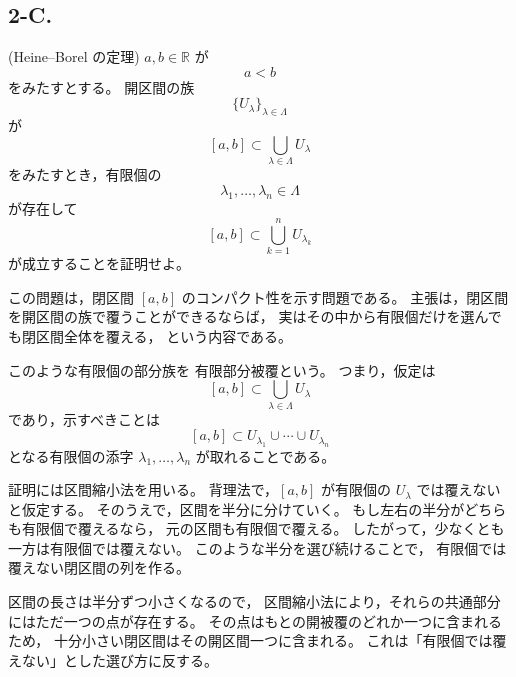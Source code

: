 \subsection{2-C.}
\begin{exercise}
	\textup{(Heine--Borel の定理)}
	\(a,b\in\mathbb{R}\) が
	\[
	a<b
	\]
	をみたすとする。
	開区間の族
	\[
	\{U_\lambda\}_{\lambda\in\Lambda}
	\]
	が
	\[
	[a,b]\subset
	\bigcup_{\lambda\in\Lambda}U_\lambda
	\]
	をみたすとき，有限個の
	\[
	\lambda_1,\ldots,\lambda_n\in\Lambda
	\]
	が存在して
	\[
	[a,b]\subset
	\bigcup_{k=1}^{n}U_{\lambda_k}
	\]
	が成立することを証明せよ。
\end{exercise}

\begin{background}
	この問題は，閉区間 \([a,b]\) のコンパクト性を示す問題である。
	主張は，閉区間を開区間の族で覆うことができるならば，
	実はその中から有限個だけを選んでも閉区間全体を覆える，
	という内容である。
	
	このような有限個の部分族を
	有限部分被覆という。
	つまり，仮定は
	\[
	[a,b]\subset
	\bigcup_{\lambda\in\Lambda}U_\lambda
	\]
	であり，示すべきことは
	\[
	[a,b]\subset
	U_{\lambda_1}\cup\cdots\cup U_{\lambda_n}
	\]
	となる有限個の添字
	\(\lambda_1,\ldots,\lambda_n\) が取れることである。
	
	証明には区間縮小法を用いる。
	背理法で，\([a,b]\) が有限個の \(U_\lambda\) では覆えないと仮定する。
	そのうえで，区間を半分に分けていく。
	もし左右の半分がどちらも有限個で覆えるなら，
	元の区間も有限個で覆える。
	したがって，少なくとも一方は有限個では覆えない。
	このような半分を選び続けることで，
	有限個では覆えない閉区間の列を作る。
	
	区間の長さは半分ずつ小さくなるので，
	区間縮小法により，それらの共通部分にはただ一つの点が存在する。
	その点はもとの開被覆のどれか一つに含まれるため，
	十分小さい閉区間はその開区間一つに含まれる。
	これは「有限個では覆えない」とした選び方に反する。
\end{background}

